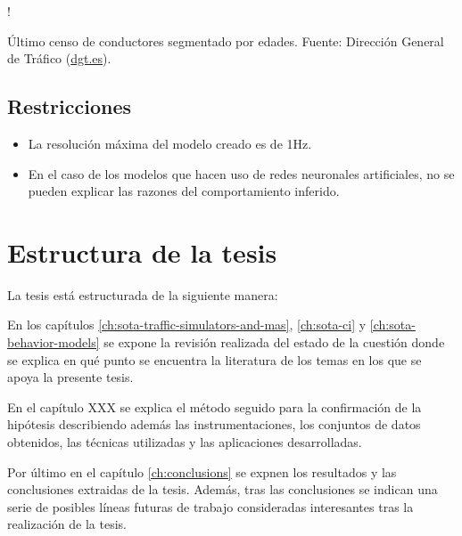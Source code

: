 \begin{marginfigure}
	\resizebox {\linewidth} {!} {
	}
	\caption{Último censo de conductores segmentado por edades. Fuente: Dirección General de Tráfico (\url{dgt.es}).}
	\label{fig:drivers-census}
\end{marginfigure}
\subsection{Restricciones}

\begin{itemize}
	\item La resolución máxima del modelo creado es de 1Hz.
	\item En el caso de los modelos que hacen uso de redes neuronales artificiales, no se pueden explicar las razones del comportamiento inferido.
\end{itemize}

\section{Estructura de la tesis}
\label{ch:intro:structure}

La tesis está estructurada de la siguiente manera:

En los capítulos \ref{ch:sota-traffic-simulators-and-mas}, \ref{ch:sota-ci} y \ref{ch:sota-behavior-models} se expone la revisión realizada del estado de la cuestión donde se explica en qué punto se encuentra la literatura de los temas en los que se apoya la presente tesis.

En el capítulo XXX se explica el método seguido para la confirmación de la hipótesis describiendo además las instrumentaciones, los conjuntos de datos obtenidos, las técnicas utilizadas y las aplicaciones desarrolladas.

Por último en el capítulo \ref{ch:conclusions} se expnen los resultados y las conclusiones extraidas de la tesis. Además, tras las conclusiones se indican una serie de posibles líneas futuras de trabajo consideradas interesantes tras la realización de la tesis.
